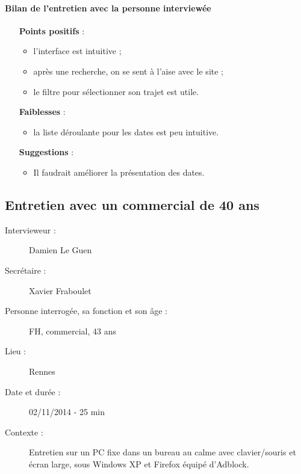 \paragraph{Bilan de l'entretien avec la personne interview\'{e}e}

\begin{itemize}
  \item [\textbf{Points positifs}] :
      \begin{itemize}
      	\item l'interface est intuitive ;
        \item apr\`{e}s une recherche, on se sent \`{a} l'aise avec le site ;
        \item le filtre pour s\'{e}lectionner son trajet est utile.
      \end{itemize}
      
  \item [\textbf{Faiblesses}] :
      \begin{itemize}
      	\item la liste d\'{e}roulante pour les dates est peu intuitive.
      \end{itemize}
      
  \item [\textbf{Suggestions}] :
      \begin{itemize}
      	\item Il faudrait am\'{e}liorer la pr\'{e}sentation des dates.
      \end{itemize}
\end{itemize}




\subsection{Entretien avec un commercial de 40 ans}

\begin{description}
\item [Intervieweur :] Damien Le Guen
\item [Secr\'{e}taire :] Xavier Fraboulet
\item [Personne interrog\'{e}e, sa fonction et son \^{a}ge :] FH, commercial, 43 ans
\item [Lieu :] Rennes
\item [Date et dur\'{e}e :] 02/11/2014 - 25 min
\item [Contexte :] Entretien sur un PC fixe dans un bureau au calme avec clavier/souris et \'{e}cran large, sous Windows XP et Firefox \'{e}quip\'{e} d'Adblock.
\end{description}


